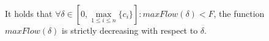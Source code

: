 \begin{lemma} \ \\
   \label{maxflowdec}
   It holds that $\forall \delta \in \left[0, \max\limits_{1 \leq i \leq n}{\{c_i\}}\right]: maxFlow\left(\delta\right) < F$,
   the function $maxFlow\left(\delta\right)$ is strictly decreasing with respect to $\delta$.
\end{lemma}
